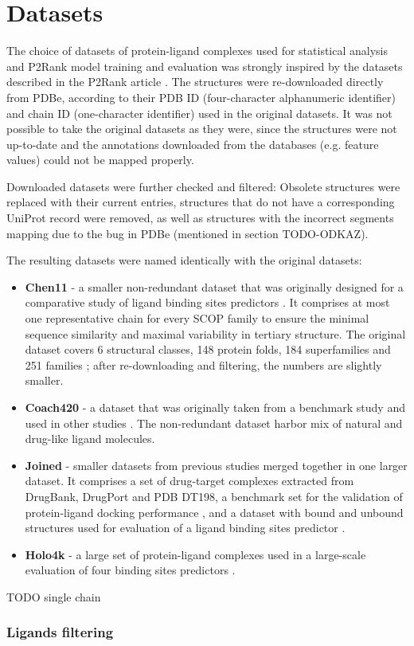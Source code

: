 \chapter{Datasets}


The choice of datasets of protein-ligand complexes used for statistical analysis and P2Rank model training and evaluation was strongly inspired by the datasets described in the P2Rank article \cite{p2rank1}. The structures were re-downloaded directly from PDBe, according to their PDB ID (four-character alphanumeric identifier) and chain ID (one-character identifier) used in the original datasets. It was not possible to take the original datasets as they were, since the structures were not up-to-date and the annotations downloaded from the databases (e.g. feature values) could not be mapped properly.

Downloaded datasets were further checked and filtered: Obsolete structures were replaced with their current entries, structures that do not have a corresponding UniProt record were removed, as well as  structures with the incorrect segments mapping due to the bug in PDBe (mentioned in section TODO-ODKAZ).


The resulting datasets were named identically with the original datasets:

\begin{itemize}
  \item \textbf{Chen11}
  - a smaller non-redundant dataset that was originally designed for a comparative study of ligand binding sites predictors \cite{benchmark}. It comprises at most one representative chain for every SCOP family \cite{scop} to ensure the minimal sequence similarity and maximal variability in tertiary structure. The original dataset covers 6 structural classes, 148 protein folds, 184 superfamilies and 251 families \cite{benchmark}; after re-downloading and filtering, the numbers are slightly smaller.
  
  \item \textbf{Coach420}
  - a dataset that was originally taken from a benchmark study \cite{cofactor} and used in other studies \cite{coach, p2rank1}. The non-redundant dataset harbor mix of natural and drug-like ligand molecules.
  
  \item \textbf{Joined}
  - smaller datasets from previous studies merged together in one larger dataset. It comprises a set of drug-target complexes extracted from DrugBank, DrugPort and PDB DT198\cite{dt}, a benchmark set for the validation of protein-ligand docking performance \cite{astex}, and a dataset with bound and unbound structures used for evaluation of a ligand binding sites predictor \cite{ligsite}.
  
  \item \textbf{Holo4k}
  - a large set of protein-ligand complexes used in a large-scale evaluation of four binding sites predictors \cite{holo4k}.
\end{itemize}



TODO single chain

\subsection{Ligands filtering}